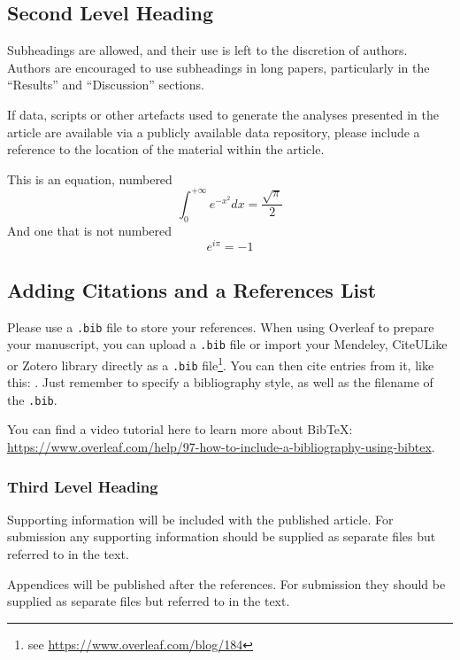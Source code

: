 \documentclass[num-refs]{wiley-article}
\begin{document}
\subsection{Second Level Heading}
Subheadings are allowed, and their use is left to the discretion of authors. 
Authors are encouraged to use subheadings in long papers, particularly in the “Results” and “Discussion” sections. 

If data, scripts or other artefacts used to generate the analyses presented in the article are available via a publicly available data repository, please include a reference to the location of the material within the article.

This is an equation, numbered
\begin{equation}
\int_0^{+\infty}e^{-x^2}dx=\frac{\sqrt{\pi}}{2}
\end{equation}
And one that is not numbered
\begin{equation*}
e^{i\pi}=-1
\end{equation*}

\subsection{Adding Citations and a References List}

Please use a \verb|.bib| file to store your references. 
When using Overleaf to prepare your manuscript, you can upload a \verb|.bib| file or import your Mendeley, CiteULike or Zotero library directly as a \verb|.bib| file\footnote{see \url{https://www.overleaf.com/blog/184}}. 
You can then cite entries from it, like this: \cite{lees2010theoretical}. 
Just remember to specify a bibliography style, as well as the filename of the \verb|.bib|.

You can find a video tutorial here to learn more about BibTeX: \url{https://www.overleaf.com/help/97-how-to-include-a-bibliography-using-bibtex}.

\subsubsection{Third Level Heading}
Supporting information will be included with the published article. 
For submission any supporting information should be supplied as separate files but referred to in the text.

Appendices will be published after the references. 
For submission they should be supplied as separate files but referred to in the text.
\end{document}
